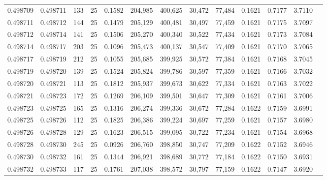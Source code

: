 \begin{tabular}{rrrrrrrrrrrrr}
0.498709 & 0.498711 & 133 &  25 &                                     0.1582 & 204,985 & 400,625 &  30,472 &  77,484 & 0.1621 & 0.7177 & 3.7110 \\
0.498711 & 0.498712 & 144 &  25 &                                     0.1479 & 205,129 & 400,481 &  30,497 &  77,459 & 0.1621 & 0.7175 & 3.7097 \\
0.498712 & 0.498714 & 141 &  25 &                                     0.1506 & 205,270 & 400,340 &  30,522 &  77,434 & 0.1621 & 0.7173 & 3.7084 \\
0.498714 & 0.498717 & 203 &  25 &                                     0.1096 & 205,473 & 400,137 &  30,547 &  77,409 & 0.1621 & 0.7170 & 3.7065 \\
0.498717 & 0.498719 & 212 &  25 &                                     0.1055 & 205,685 & 399,925 &  30,572 &  77,384 & 0.1621 & 0.7168 & 3.7045 \\
0.498719 & 0.498720 & 139 &  25 &                                     0.1524 & 205,824 & 399,786 &  30,597 &  77,359 & 0.1621 & 0.7166 & 3.7032 \\
0.498720 & 0.498721 & 113 &  25 &                                     0.1812 & 205,937 & 399,673 &  30,622 &  77,334 & 0.1621 & 0.7163 & 3.7022 \\
0.498721 & 0.498723 & 172 &  25 &                                     0.1269 & 206,109 & 399,501 &  30,647 &  77,309 & 0.1621 & 0.7161 & 3.7006 \\
0.498723 & 0.498725 & 165 &  25 &                                     0.1316 & 206,274 & 399,336 &  30,672 &  77,284 & 0.1622 & 0.7159 & 3.6991 \\
0.498725 & 0.498726 & 112 &  25 &                                     0.1825 & 206,386 & 399,224 &  30,697 &  77,259 & 0.1621 & 0.7157 & 3.6980 \\
0.498726 & 0.498728 & 129 &  25 &                                     0.1623 & 206,515 & 399,095 &  30,722 &  77,234 & 0.1621 & 0.7154 & 3.6968 \\
0.498728 & 0.498730 & 245 &  25 &                                     0.0926 & 206,760 & 398,850 &  30,747 &  77,209 & 0.1622 & 0.7152 & 3.6946 \\
0.498730 & 0.498732 & 161 &  25 &                                     0.1344 & 206,921 & 398,689 &  30,772 &  77,184 & 0.1622 & 0.7150 & 3.6931 \\
0.498732 & 0.498733 & 117 &  25 &                                     0.1761 & 207,038 & 398,572 &  30,797 &  77,159 & 0.1622 & 0.7147 & 3.6920 \\

\end{tabular}
